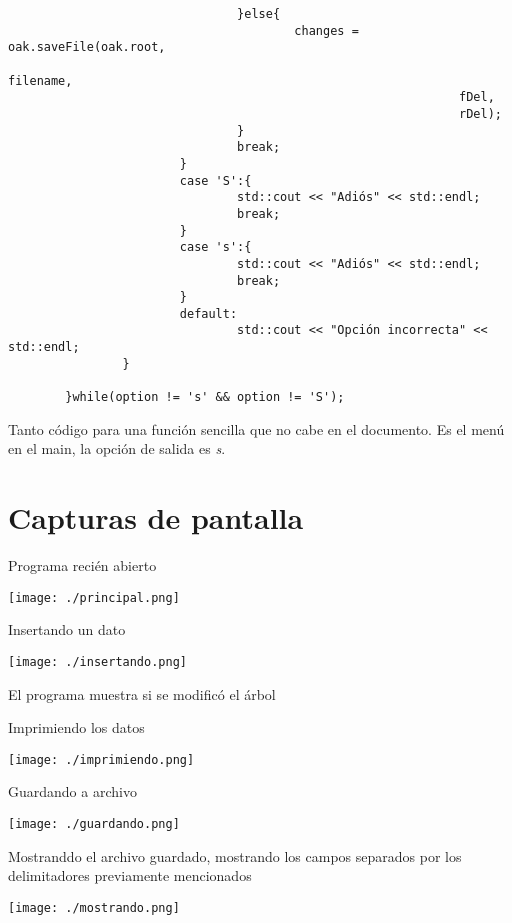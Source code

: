 \documentclass[11pt]{article}
\begin{document}
\begin{verbatim}
                                }else{
                                        changes = oak.saveFile(oak.root,
                                                               filename,
                                                               fDel,
                                                               rDel);
                                }
                                break;
                        }
                        case 'S':{
                                std::cout << "Adiós" << std::endl;
                                break;
                        }
                        case 's':{
                                std::cout << "Adiós" << std::endl;
                                break;
                        }
                        default:
                                std::cout << "Opción incorrecta" << std::endl;
                }

        }while(option != 's' && option != 'S');
\end{verbatim}

Tanto código para una función sencilla que no cabe
en el documento.
Es el menú en el main, la opción de salida es \emph{s}.
\section{Capturas de pantalla}
\label{sec:org0352024}
Programa recién abierto
\begin{center}
\texttt{[image: ./principal.png]}
\end{center}

Insertando un dato
\begin{center}
\texttt{[image: ./insertando.png]}
\end{center}
El programa muestra si se modificó el árbol

Imprimiendo los datos
\begin{center}
\texttt{[image: ./imprimiendo.png]}
\end{center}

Guardando a archivo
\begin{center}
\texttt{[image: ./guardando.png]}
\end{center}


Mostranddo el archivo guardado, mostrando los
campos separados por los delimitadores previamente
mencionados
\begin{center}
\texttt{[image: ./mostrando.png]}
\end{center}
\end{document}
